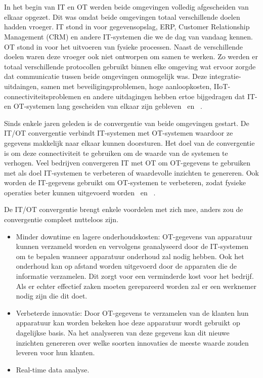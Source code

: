 \section{}
\label{sec:Convergentie IT en OT}
In het begin van IT en OT werden beide omgevingen volledig afgescheiden van elkaar opgezet. Dit was omdat beide omgevingen totaal verschillende doelen hadden vroeger. IT stond in voor gegevensopslag, ERP, Customer Relationship Management (CRM) en andere IT-systemen die we de dag van vandaag kennen. OT stond in voor het uitvoeren van fysieke processen. Naast de verschillende doelen waren deze vroeger ook niet ontworpen om samen te werken. Zo werden er totaal verschillende protocollen gebruikt binnen elke omgeving wat ervoor zorgde dat communicatie tussen beide omgevingen onmogelijk was. Deze integratie-uitdaingen, samen met beveiligingsproblemen, hoge aanloopkosten, IIoT-connectiviteitsproblemen en andere uitdagingen hebben ertoe bijgedragen dat IT- en OT-systemen lang gescheiden van elkaar zijn gebleven~\autocite{Remy2020} en ~\autocite{SecureiconTeam2019}.

Sinds enkele jaren geleden is de convergentie van beide omgevingen gestart. De IT/OT convergentie verbindt IT-systemen met OT-systemen waardoor ze gegevens makkelijk naar elkaar kunnen doorsturen. Het doel van de convergentie is om deze connectiviteit te gebruiken om de waarde van de systemen te verhogen. Veel bedrijven convergeren IT met OT om OT-gegevens te gebruiken met als doel IT-systemen te verbeteren of waardevolle inzichten te genereren. Ook worden de IT-gegevens gebruikt om OT-systemen te verbeteren, zodat fysieke operaties beter kunnen uitgevoerd worden~\autocite{Remy2020} en ~\autocite{SecureiconTeam2019}. 

De IT/OT convergentie brengt enkele voordelen met zich mee, anders zou de convergentie compleet nutteloos zijn. 
\begin{itemize}
    \item Minder downtime en lagere onderhoudskosten: OT-gegevens van apparatuur kunnen verzameld worden en vervolgens geanalyseerd door de IT-systemen om te bepalen wanneer apparatuur onderhoud zal nodig hebben. Ook het onderhoud kan op afstand worden uitgevoerd door de apparaten die de informatie verzamelen. Dit zorgt voor een verminderde kost voor het bedrijf. Als er echter effectief zaken moeten gerepareerd worden zal er een werknemer nodig zijn die dit doet.
    \item Verbeterde innovatie: Door OT-gegevens te verzamelen van de klanten hun apparatuur kan worden bekeken hoe deze apparatuur wordt gebruikt op dagelijkse basis. Na het analyseren van deze gegevens kan dit nieuwe inzichten genereren over welke soorten innovaties de meeste waarde zouden leveren voor hun klanten. 
    \item Real-time data analyse.
\end{itemize}

